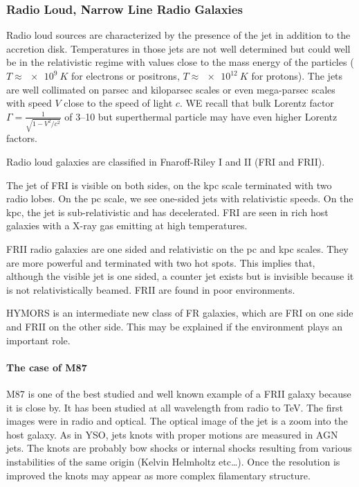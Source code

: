 \documentclass[10pt,a4paper,english]{article}
\begin{document}
\subsubsection{Radio Loud, Narrow Line Radio Galaxies}
Radio loud sources are characterized by the presence of the jet in
addition to the accretion disk. Temperatures in those jets are not
well determined but could well be in the relativistic regime with
values close to the mass energy of the particles
($T \approx \SI{e9}{K}$ for electrons or positrons,
$T\approx \SI{e12}{K}$ for protons). The jets are well collimated on
parsec and kiloparsec scales or even mega-parsec scales with speed $V$
close to the speed of light $c$. WE recall that bulk Lorentz factor
$\Gamma = \frac{1}{\sqrt{1 - V^2/c^2}}$ of \numrange{3}{10} but
superthermal particle may have even higher Lorentz factors.

Radio loud galaxies are classified in Fnaroff-Riley I and II (FRI and
FRII).

The jet of FRI is visible on both sides, on the kpc scale terminated
with two radio lobes. On the pc scale, we see one-sided jets with
relativistic speeds. On the kpc, the jet is sub-relativistic and has
decelerated. FRI are seen in rich host galaxies with a X-ray gas
emitting at high temperatures.

FRII radio galaxies are one sided and relativistic on the pc and kpc scales. They are more powerful and terminated with two hot spots. This implies that, although the visible jet is one sided, a counter jet exists but is invisible because it is not relativistically beamed. FRII are found in poor environments.

HYMORS is an intermediate new class of FR galaxies, which are FRI on one side and FRII on the other side. This may be explained if the environment plays an important role.

\paragraph{The case of M87}
M87 is one of the best studied and well known example of a FRII galaxy
because it is close by. It has been studied at all wavelength from
radio to \si{TeV}. The first images were in radio and optical. The
optical image of the jet is a zoom into the host galaxy. As in YSO,
jets knots with proper motions are measured in AGN jets. The knots are
probably bow shocks or internal shocks resulting from various
instabilities of the same origin (Kelvin Helmholtz etc…). Once the
resolution is improved the knots may appear as more complex
filamentary structure.
\end{document}
